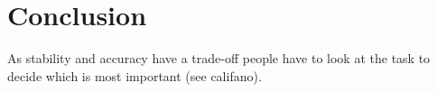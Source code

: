 \chapter{Conclusion}
\label{chapter:conclusion}



As stability and accuracy have a trade-off people have to look at the task to decide which is most important (see califano).

